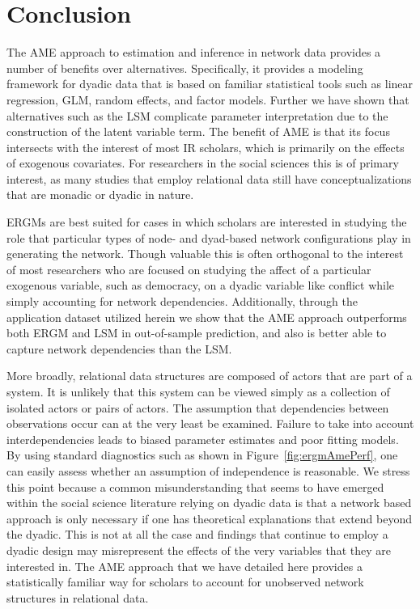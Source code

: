 \section*{\textbf{Conclusion}}

The AME approach to estimation and inference in network data provides a number of benefits over alternatives. Specifically, it provides a modeling framework for dyadic data that is based on familiar statistical tools such as linear regression, GLM, random effects, and factor models. Further we have shown that alternatives such as the LSM complicate parameter interpretation due to the construction of the latent variable term. The benefit of AME is that its focus intersects with the interest of most IR scholars, which is primarily on the effects of exogenous covariates. For researchers in the social sciences this is of primary interest, as many studies that employ relational data still have conceptualizations that are monadic or dyadic in nature.

ERGMs are best suited for cases in which scholars are interested in studying the role that particular types of node- and dyad-based network configurations play in generating the network. Though valuable this is often orthogonal to the interest of most researchers who are focused on studying the affect of a particular exogenous variable, such as democracy, on a dyadic variable like conflict while simply accounting for network dependencies. Additionally, through the application dataset utilized herein we show that the AME approach outperforms both ERGM and LSM in out-of-sample prediction, and also is better able to capture network dependencies than the LSM.

More broadly, relational data structures are composed of actors that are part of a system. It is unlikely that this system can be viewed simply as a collection of isolated actors or pairs of actors. The assumption  that dependencies between observations occur can at the very least be examined. Failure to take into account interdependencies leads to biased parameter estimates and poor fitting models. By using standard diagnostics such as shown in Figure~\ref{fig:ergmAmePerf}, one can easily assess whether an assumption of independence is reasonable. We stress this point because a common misunderstanding that seems to have emerged within the social science literature relying on dyadic data is that a network based approach is only necessary if one has theoretical explanations that extend beyond the dyadic. This is not at all the case and findings that continue to employ a dyadic design may misrepresent the effects of the very variables that they are interested in. The AME approach that we have detailed here provides a statistically familiar way for scholars to account for unobserved network structures in relational data. 